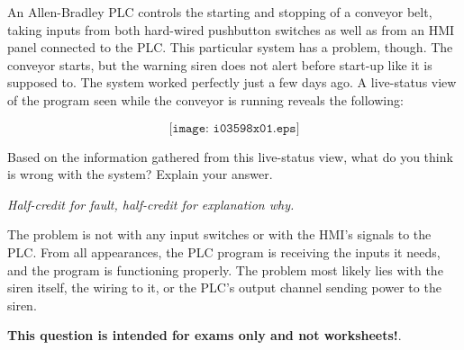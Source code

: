 

An Allen-Bradley PLC controls the starting and stopping of a conveyor belt, taking inputs from both hard-wired pushbutton switches as well as from an HMI panel connected to the PLC.  This particular system has a problem, though.  The conveyor starts, but the warning siren does not alert before start-up like it is supposed to.  The system worked perfectly just a few days ago.  A live-status view of the program seen while the conveyor is running reveals the following:

$$\texttt{[image: i03598x01.eps]}$$

Based on the information gathered from this live-status view, what do you think is wrong with the system?  Explain your answer.







{\it Half-credit for fault, half-credit for explanation why.}

\vskip 10pt

The problem is not with any input switches or with the HMI's signals to the PLC.  From all appearances, the PLC program is receiving the inputs it needs, and the program is functioning properly.  The problem most likely lies with the siren itself, the wiring to it, or the PLC's output channel sending power to the siren.







{\bf This question is intended for exams only and not worksheets!}.



